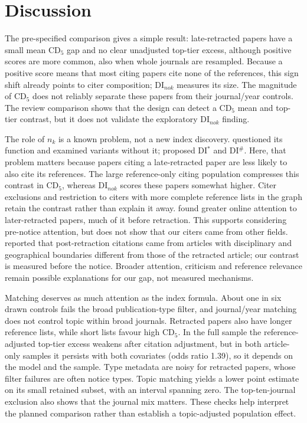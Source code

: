 \section{Discussion}\label{sec:discussion}

The pre-specified comparison gives a simple result: late-retracted papers have a small mean CD$_5$ gap and no clear
unadjusted top-tier excess, although positive scores are more common, also when whole journals are resampled.
Because a positive score means that most citing papers cite none of the references, this sign shift already points
to citer composition; DI$_{nok}$ measures its size. The magnitude of CD$_5$ does not reliably separate these papers
from their journal/year controls. The review comparison shows that the design can detect a CD$_5$
mean and top-tier contrast, but it does not validate the exploratory DI$_{nok}$ finding.

The role of $n_k$ is a known problem, not a new index discovery. \citet{bornmann2020convergent} questioned its function
and examined variants without it; \citet{leydesdorff2021revision} proposed DI$^*$ and DI$^{\#}$.
Here, that problem matters because papers citing a late-retracted paper are less likely to also cite its references.
The large reference-only citing population compresses this contrast in CD$_5$, whereas DI$_{nok}$ scores these
papers somewhat higher. Citer exclusions and restriction to citers with more complete reference lists in the graph
retain the contrast rather than explain it away.
\citet{peng2022attention} found greater online attention to later-retracted papers, much of it before retraction.
This supports considering pre-notice attention, but does not show that our citers came from other fields.
\citet{dinh2019citations} reported that post-retraction citations came from articles with disciplinary and
geographical boundaries different from those of the retracted article; our contrast is measured before the notice.
Broader attention, criticism and reference relevance remain possible explanations for our gap, not measured mechanisms.

Matching deserves as much attention as the index formula. About one in six drawn controls fails the broad
publication-type filter, and journal/year matching does not control topic within broad journals.
Retracted papers also have longer reference lists, while short lists favour high CD$_5$.
In the full sample the reference-adjusted top-tier excess weakens after citation adjustment, but in both
article-only samples it persists with both covariates (odds ratio 1.39), so it depends on the model and the sample.
Type metadata are noisy for retracted papers, whose filter failures are often notice types.
Topic matching yields a lower point estimate on its small retained subset, with an interval spanning zero.
The top-ten-journal exclusion also shows that the journal mix matters.
These checks help interpret the planned comparison rather than establish a topic-adjusted population effect.

